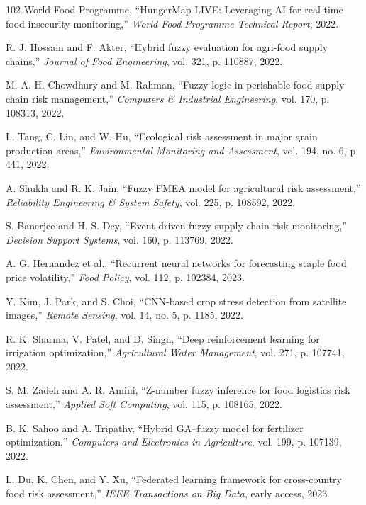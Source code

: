 \documentclass[preprint,12pt]{elsarticle}
\begin{document}
\begin{thebibliography}{102}
		World Food Programme, ``HungerMap LIVE: Leveraging AI for real-time food insecurity monitoring,'' \emph{World Food Programme Technical Report}, 2022.
		
		R. J. Hossain and F. Akter, ``Hybrid fuzzy evaluation for agri-food supply chains,'' \emph{Journal of Food Engineering}, vol. 321, p. 110887, 2022.
		
		M. A. H. Chowdhury and M. Rahman, ``Fuzzy logic in perishable food supply chain risk management,'' \emph{Computers \& Industrial Engineering}, vol. 170, p. 108313, 2022.
		
		L. Tang, C. Lin, and W. Hu, ``Ecological risk assessment in major grain production areas,'' \emph{Environmental Monitoring and Assessment}, vol. 194, no. 6, p. 441, 2022.
		
		A. Shukla and R. K. Jain, ``Fuzzy FMEA model for agricultural risk assessment,'' \emph{Reliability Engineering \& System Safety}, vol. 225, p. 108592, 2022.
		
		S. Banerjee and H. S. Dey, ``Event-driven fuzzy supply chain risk monitoring,'' \emph{Decision Support Systems}, vol. 160, p. 113769, 2022.
		
		A. G. Hernandez et al., ``Recurrent neural networks for forecasting staple food price volatility,'' \emph{Food Policy}, vol. 112, p. 102384, 2023.
		
		Y. Kim, J. Park, and S. Choi, ``CNN-based crop stress detection from satellite images,'' \emph{Remote Sensing}, vol. 14, no. 5, p. 1185, 2022.
		
		R. K. Sharma, V. Patel, and D. Singh, ``Deep reinforcement learning for irrigation optimization,'' \emph{Agricultural Water Management}, vol. 271, p. 107741, 2022.
		
		S. M. Zadeh and A. R. Amini, ``Z-number fuzzy inference for food logistics risk assessment,'' \emph{Applied Soft Computing}, vol. 115, p. 108165, 2022.
		
		B. K. Sahoo and A. Tripathy, ``Hybrid GA--fuzzy model for fertilizer optimization,'' \emph{Computers and Electronics in Agriculture}, vol. 199, p. 107139, 2022.
		
		L. Du, K. Chen, and Y. Xu, ``Federated learning framework for cross-country food risk assessment,'' \emph{IEEE Transactions on Big Data}, early access, 2023.
		

\end{thebibliography}
\end{document}
